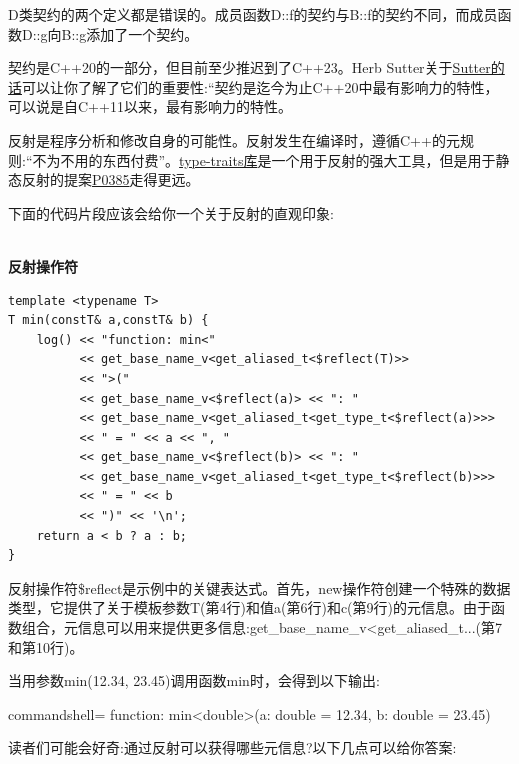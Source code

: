D类契约的两个定义都是错误的。成员函数D::f的契约与B::f的契约不同，而成员函数D::g向B::g添加了一个契约。

\begin{tcolorbox}[breakable,enhanced jigsaw,colback=blue!5!white,colframe=blue!75!black,title={结束语}]
契约是C++20的一部分，但目前至少推迟到了C++23。Herb Sutter关于\href{https://herbsutter.com/2018/07/02/trip-report-summer-iso-c-standards-meeting-rapperswil/}{Sutter的话}可以让你了解了它们的重要性:“契约是迄今为止C++20中最有影响力的特性，可以说是自C++11以来，最有影响力的特性。
\end{tcolorbox}


反射是程序分析和修改自身的可能性。反射发生在编译时，遵循C++的元规则:“不为不用的东西付费”。\href{https://en.cppreference.com/w/cpp/header/type_traits}{type-traits库}是一个用于反射的强大工具，但是用于静态反射的提案\href{http://www.open-std.org/jtc1/sc22/wg21/docs/papers/2017/p0385r2.pdf}{P0385}走得更远。

下面的代码片段应该会给你一个关于反射的直观印象:

\hspace*{\fill} \\ %
\noindent
\textbf{反射操作符}
\begin{lstlisting}[style=styleCXX]
template <typename T>
T min(constT& a,constT& b) {
	log() << "function: min<"
		  << get_base_name_v<get_aliased_t<$reflect(T)>>
		  << ">("
		  << get_base_name_v<$reflect(a)> << ": "
		  << get_base_name_v<get_aliased_t<get_type_t<$reflect(a)>>>
		  << " = " << a << ", "
		  << get_base_name_v<$reflect(b)> << ": "
		  << get_base_name_v<get_aliased_t<get_type_t<$reflect(b)>>>
		  << " = " << b
		  << ")" << '\n';
	return a < b ? a : b;
}
\end{lstlisting}

反射操作符\$reflect是示例中的关键表达式。首先，new操作符创建一个特殊的数据类型，它提供了关于模板参数T(第4行)和值a(第6行)和c(第9行)的元信息。由于函数组合，元信息可以用来提供更多信息:get\_base\_name\_v<get\_aliased\_t...(第7和第10行)。

当用参数min(12.34, 23.45)调用函数min时，会得到以下输出:

\begin{tcblisting}{commandshell={}}
function: min<double>(a: double = 12.34, b: double = 23.45)
\end{tcblisting}

读者们可能会好奇:通过反射可以获得哪些元信息?以下几点可以给你答案:

